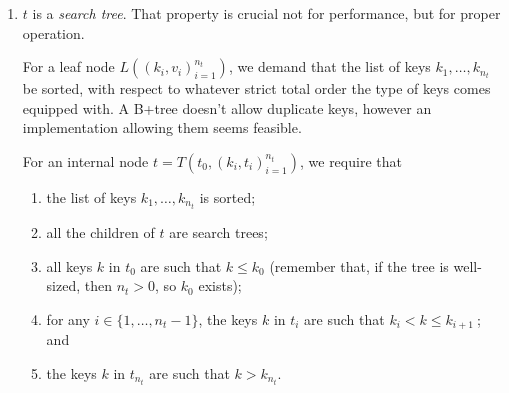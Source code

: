 \documentclass[11pt]{article}
\begin{document}
{\begin{enumerate}
    That invariant guarantees that the complete B$\pm$tree will have a number of nodes that is not too high compared to the number of mappings it contains. The interest of that invariant is to rule out nearly-empty nodes.
In the early days of databases, all the data was stored on slow discs, and a B+tree node's entries would be stored in a dedicated sector or block.
Having nodes with few entries would increase disk usage as well as the total depth of the tree, which decreases cache locality of the program and makes lookups slower.
    The same reasoning applies today to RAM blocks and/or cache lines.
  \item \label{} $t$ is a \emph{search tree}. That property is crucial not for performance, but for proper operation.

    For a leaf node $L((k_i, v_i)_{i = 1}^{n_t})$, we demand that the list of keys $k_1, \dots, k_{n_t}$ be sorted, with respect to whatever strict total order the type of keys comes equipped with.
    A B+tree doesn't allow duplicate keys, however an implementation allowing them seems feasible.

    For an internal node $t = T(t_0, (k_i, t_i)_{i = 1}^{n_t})$, we require that
    \begin{enumerate}
      \item the list of keys $k_1, \dots, k_{n_t}$ is sorted;
      \item all the children of $t$ are search trees;
      \item all keys $k$ in $t_0$ are such that $k \le k_0$ (remember that, if the tree is well-sized, then $n_t > 0$, so $k_0$ exists);
      \item for any $i \in \{1, \dots, n_t - 1\}$, the keys $k$ in $t_i$ are such that $k_i < k \le k_{i + 1}\ $; and
      \item the keys $k$ in $t_{n_t}$ are such that $k > k_{n_t}$.
    \end{enumerate}

\end{enumerate}

\begin{figure}
\centering
{}
\end{figure}}
\end{document}
